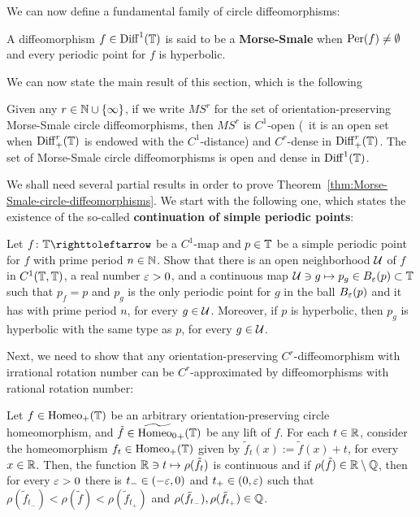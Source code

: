 We can now define a fundamental family of circle diffeomorphisms:
\begin{definition}
  A diffeomorphism $f\in\mathrm{Diff}_{}^{1}(\mathbb{T})$ is said to be a \textbf{Morse-Smale} when $\operatorname{Per}(f)\neq\emptyset$ and every periodic point for $f$ is hyperbolic.
\end{definition}

We can now state the main result of this section, which is the following

\begin{theorem}
  \label{thm:Morse-Smale-circle-diffeomorphisms}
  Given any $r\in\mathbb{N}\cup\{\infty\}$, if we write $MS^r$ for the set of orientation-preserving Morse-Smale circle diffeomorphisms, then $MS^r$ is $C^1$-open (\ie~it is an open set when $\mathrm{Diff}_{+}^{r}(\mathbb{T})$ is endowed with the $C^1$-distance) and $C^r$-dense in $\mathrm{Diff}_{+}^{r}(\mathbb{T})$.
  The set of Morse-Smale circle diffeomorphisms is open and dense in $\mathrm{Diff}_{}^{1}(\mathbb{T})$.
\end{theorem}

We shall need several partial results in order to prove Theorem~\ref{thm:Morse-Smale-circle-diffeomorphisms}. We start with the following one, which states the existence of the so-called \textbf{continuation of simple periodic points}:

\begin{exercise}
  \label{ex:continuation-simple-periodic-points}
  Let $f\colon\T\carr$ be a $C^1$-map and $p\in\mathbb{T}$ be a simple periodic point for $f$ with prime period $n\in\mathbb{N}$. Show that there is an open neighborhood $\mathcal{U}$ of $f$ in $C^1(\mathbb{T},\mathbb{T})$, a real number $\varepsilon>0$, and a continuous map $\mathcal{U}\ni g\mapsto p_g\in B_\varepsilon(p)\subset\mathbb{T}$ such that $p_f=p$ and $p_g$ is the only periodic point for $g$ in the ball $B_\varepsilon(p)$ and it has with prime period $n$, for every $g\in\mathcal{U}$. Moreover, if $p$ is hyperbolic, then $p_g$ is hyperbolic with the same type as $p$, for every $g\in\mathcal{U}$.
\end{exercise}

Next, we need to show that any orientation-preserving $C^r$-diffeomorphism with irrational rotation number can be $C^r$-approximated by diffeomorphisms with rational rotation number:

\begin{theorem}
  \label{thm:closing-lemma-circle}
  Let $f\in\mathrm{Homeo}_{+}(\mathbb{T})$ be an arbitrary orientation-preserving circle homeomorphism, and $\tilde f\in\widetilde{\mathrm{Homeo}_0}_+(\mathbb{T})$ be any lift of $f$. For each $t\in\mathbb{R}$, consider the homeomorphism $f_t\in\mathrm{Homeo}_{+}(\mathbb{T})$ given by $\tilde f_t(x):=\tilde f(x)+t$, for every $x\in\mathbb{R}$. Then, the function $\mathbb{R}\ni t\mapsto \rho(\tilde f_t)$ is continuous and if $\rho(\tilde f)\in\mathbb{R}\setminus\mathbb{Q}$, then for every $\varepsilon>0$ there is $t_-\in (-\varepsilon,0)$ and $t_+\in (0,\varepsilon)$ such that $\rho(\tilde f_{t_-})<\rho(\tilde f)<\rho(\tilde f_{t_+})$ and $\rho(\tilde f_{t_-}),\rho(\tilde f_{t_+})\in\mathbb{Q}$.
\end{theorem}

